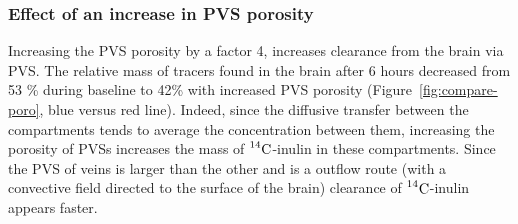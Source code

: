 \documentclass[10pt]{article}
\newcommand{\1}{^{(1)}}
\newcommand{\2}{^{(2)}}
\newcommand{\Cinulin}{$\prescript{14}{}{\text{C}}$-inulin }
\begin{document}
\subsubsection{Effect of an increase in PVS porosity}

Increasing the PVS porosity by a factor 4, increases clearance from the brain via PVS. The relative mass of tracers found in the brain after 6 hours decreased from 53 \% during baseline to 42\% with increased PVS porosity (Figure~\ref{fig:compare-poro}, blue versus red line). Indeed, since the diffusive transfer between the compartments tends to average the concentration between them, increasing the porosity of PVSs increases the mass of \Cinulin in these compartments. Since the PVS of veins is larger than the other and is a outflow route (with a convective field directed to the surface of the brain) clearance of \Cinulin appears faster.


\end{document}

